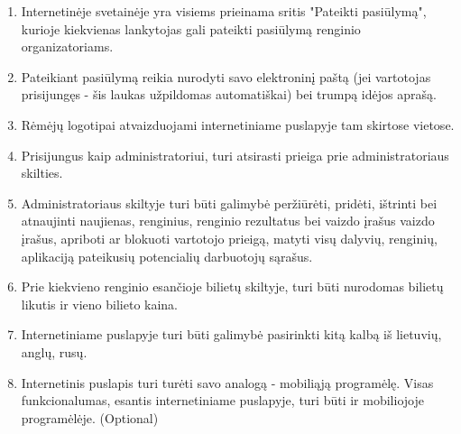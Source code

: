 \documentclass{VUMIFPSkursinis}
\begin{document}
\begin{enumerate}
			\item Internetinėje svetainėje yra visiems prieinama sritis "Pateikti pasiūlymą", kurioje kiekvienas lankytojas gali pateikti pasiūlymą renginio organizatoriams.
			\item Pateikiant pasiūlymą reikia nurodyti savo elektroninį paštą (jei vartotojas prisijungęs - šis laukas užpildomas automatiškai) bei trumpą idėjos aprašą.
			\item Rėmėjų logotipai atvaizduojami internetiniame puslapyje tam skirtose vietose.
			\item Prisijungus kaip administratoriui, turi atsirasti prieiga prie administratoriaus skilties.
			\item Administratoriaus skiltyje turi būti galimybė peržiūrėti, pridėti, ištrinti bei atnaujinti naujienas, renginius, renginio rezultatus bei vaizdo įrašus vaizdo įrašus, apriboti ar blokuoti vartotojo prieigą, matyti visų dalyvių, renginių, aplikaciją pateikusių potencialių darbuotojų sąrašus.
			\item Prie kiekvieno renginio esančioje bilietų skiltyje, turi būti nurodomas bilietų likutis ir vieno bilieto kaina.
			\item Internetiniame puslapyje turi būti galimybė pasirinkti kitą kalbą iš lietuvių, anglų, rusų.
			\item Internetinis puslapis turi turėti savo analogą - mobiliąją programėlę. Visas funkcionalumas, esantis internetiniame puslapyje, turi būti ir mobiliojoje programėlėje. (Optional)
		\end{enumerate}
		
\end{document}
